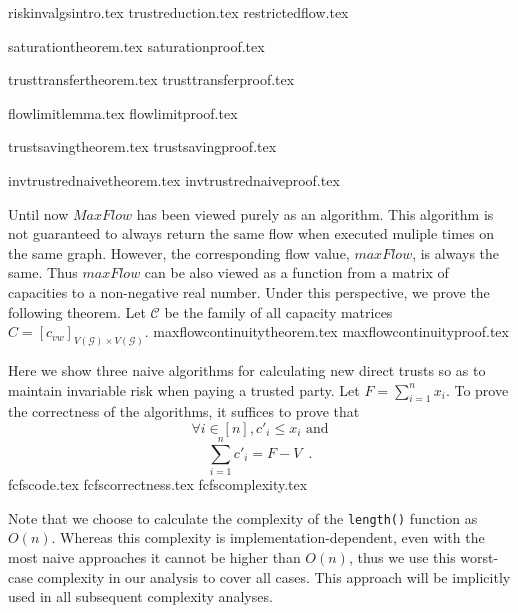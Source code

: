 \documentclass[11pt]{llncs}
\begin{document}
  {riskinvalgsintro.tex}
  {trustreduction.tex}
  {restrictedflow.tex}

  {saturationtheorem.tex}
  {saturationproof.tex}

  {trusttransfertheorem.tex}
  {trusttransferproof.tex}

  {flowlimitlemma.tex}
  {flowlimitproof.tex}

  {trustsavingtheorem.tex}
  {trustsavingproof.tex}

  {invtrustrednaivetheorem.tex}
  {invtrustrednaiveproof.tex}

  Until now $MaxFlow$ has been viewed purely as an algorithm. This algorithm is not guaranteed to always return the same
  flow when executed muliple times on the same graph. However, the corresponding flow value, $maxFlow$, is always the same.
  Thus $maxFlow$ can be also viewed as a function from a matrix of capacities to a non-negative real number. Under this
  perspective, we prove the following theorem. Let $\mathcal{C}$ be the family of all capacity matrices
  $C = [c_{vw}]_{V\left(\mathcal{G}\right) \times V\left(\mathcal{G}\right)}$.
  {maxflowcontinuitytheorem.tex}
  {maxflowcontinuityproof.tex}

  Here we show three naive algorithms for calculating new direct trusts so as to maintain invariable risk when paying
  a trusted party. Let $F = \sum\limits_{i=1}^{n}x_i$. To prove the correctness of the algorithms, it suffices to prove that
  \begin{equation}
  \label{naive:req1}
     \forall i \in [n], c'_i \leq x_i \mbox{ and}
  \end{equation}
  \begin{equation}
  \label{naive:req2}
     \sum\limits_{i=1}^{n}c'_i = F - V \enspace.
  \end{equation}
  {fcfscode.tex}
  {fcfscorrectness.tex}
  {fcfscomplexity.tex}

  Note that we choose to calculate the complexity of the \texttt{length()} function as $O\left(n\right)$. Whereas this
  complexity is implementation-dependent, even with the most naive approaches it cannot be higher than $O\left(n\right)$,
  thus we use this worst-case complexity in our analysis to cover all cases. This approach will be implicitly used in all
  subsequent complexity analyses.
\end{document}
